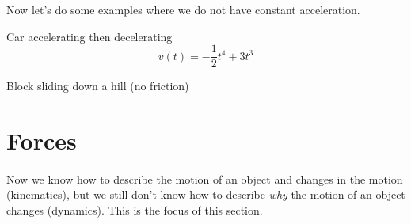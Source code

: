 \documentclass[../newtonian_mechanics.tex]{subfiles}
\begin{document}
        Now let's do some examples where we do not have constant acceleration.
        \begin{example}
            Car accelerating then decelerating %
            \begin{equation*}
                v(t)=-\frac{1}{2}t^4+3t^3
            \end{equation*}
        \end{example}
        \begin{example}
            Block sliding down a hill (no friction) %
        \end{example}

    \section{Forces}
        \paragraph{}
        Now we know how to describe the motion of an object and changes in the motion (kinematics), but we still don't know how to describe \textit{why} the motion of an object changes (dynamics). This is the focus of this section.
\end{document}
